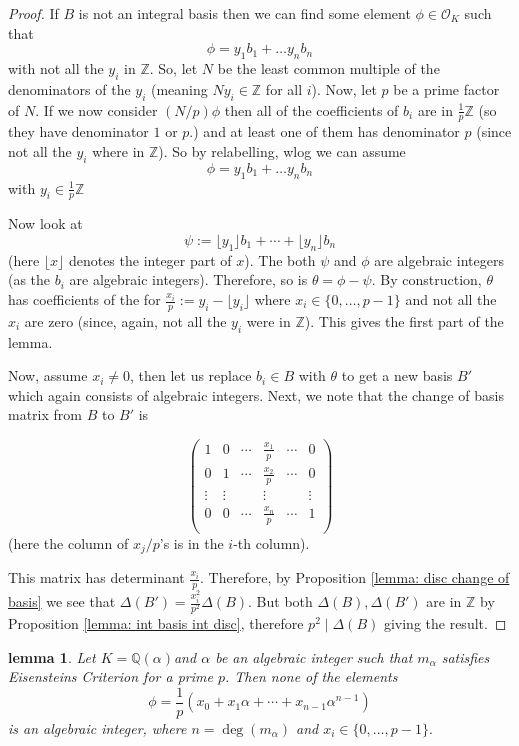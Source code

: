 \documentclass[11pt,a4paper]{amsart}
\theoremstyle{plain}
\newtheorem{lemma}[subsection]{lemma}
\theoremstyle{definition}
\theoremstyle{definition}
\newcommand{\ZZ}{\mathbb{Z}}
\def\QQ{\mathbb{Q}}
\def \a{\alpha}
\def \OO {\mathcal{O}}
\begin{document}
	\begin{proof}
		If $B$ is not an integral basis then we can find some element $\phi \in \OO_K$ such that \[\phi=y_1b_1+\dots y_nb_n\] with not all the $y_i$ in $\ZZ$. So, let $N$ be the least common multiple of the denominators of the $y_i$ (meaning $Ny_i \in \ZZ$ for all $i$). Now, let $p$ be a prime factor of $N$. If we now consider $(N/p)\phi$ then all of the coefficients of $b_i$ are in $\frac{1}{p} \ZZ$ (so they have denominator $1$ or $p$.) and at least one of them has denominator $p$ (since not all the $y_i$ where in $\ZZ$). So by relabelling, wlog we can assume \[\phi=y_1b_1+\dots y_nb_n\] with $y_i \in  \frac{1}{p} \ZZ$
		
		Now look at \[\psi:=\lfloor y_1 \rfloor b_1+\cdots+\lfloor y_n \rfloor b_n\] (here $\lfloor x \rfloor$ denotes the integer part of $x$). The both $\psi$ and $\phi$ are algebraic integers (as the $b_i$ are algebraic integers). Therefore, so is $\theta=\phi-\psi$. By construction, $\theta$ has coefficients of the for $\frac{x_i}{p}:=y_i-\lfloor y_i \rfloor$ where $x_i \in \{0,\dots,p-1\}$ and not all the $x_i$ are zero (since, again, not all the $y_i$ were in $\ZZ$). This gives the first part of the lemma.
		
		Now, assume $x_i \neq 0$, then let us replace $b_i \in B$ with $\theta$ to get a new basis $B'$ which again consists of algebraic integers. Next, we note that the change of basis matrix from $B$ to $B'$ is 
		
		\[ \left( \begin{matrix}
			1&0&\cdots& \frac{x_1}{p}& \cdots &0 \\
			0&1&\cdots& \frac{x_2}{p}& \cdots &0 \\
			\vdots& \vdots&&\vdots&&\vdots \\
			0&0&\cdots& \frac{x_n}{p}& \cdots &1 \\
		\end{matrix}                          \right) \](here the column of $x_j/p$'s is in the $i$-th column).
		
		This matrix has determinant $\frac{x_i}{p}.$ Therefore, by 	Proposition \ref{lemma: disc change of basis} we see that $\Delta(B')=\frac{x_i^2}{p^2}\Delta(B)$. But both $\Delta(B),\Delta(B')$ are  in $\ZZ$ by Proposition \ref{lemma: int basis int disc}, therefore $p^2 \mid \Delta(B)$ giving the result.
	\end{proof}
	
	\begin{lemma}\label{lemma: eis crit and alg ints}
		Let $K=\QQ(\a)$and $\a$ be an algebraic integer such that $m_\a$ satisfies Eisensteins Criterion for a prime $p$. Then none of the elements \[\phi=\frac{1}{p}(x_0+x_1\a+\cdots+x_{n-1}\a^{n-1})\] is an algebraic integer, where $n=\deg(m_\a)$ and $x_i \in \{0,\dots,p-1\}.$
	\end{lemma} 
	
\end{document}
